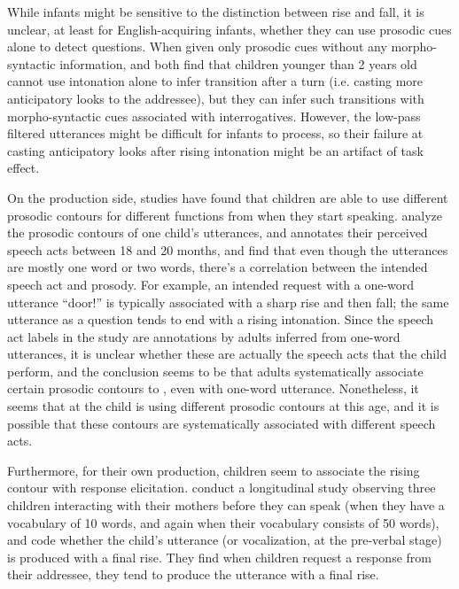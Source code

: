 While infants might be sensitive to the distinction between rise and fall, it is unclear, at least for English-acquiring infants, whether they can use prosodic cues alone to detect questions. When given only prosodic cues without any morpho-syntactic information, \textcite{keitel2013turn} and \textcite{casillas2017turn} both find that children younger than 2 years old cannot use intonation alone to infer transition after a turn (i.e. casting more anticipatory looks to the addressee), but they can infer such transitions with morpho-syntactic cues associated with interrogatives. However, the low-pass filtered utterances might be difficult for infants to process, so their failure at casting anticipatory looks after rising intonation might be an artifact of task effect.

On the production side, studies have found that children are able to use different prosodic contours for different functions from when they start speaking. \textcite{menyuk1969prosody} analyze the prosodic contours of one child's utterances, and annotates their perceived speech acts between 18  and 20 months, and find that even though the utterances are mostly one word or two words, there's a correlation between the intended speech act and prosody. For example, an intended request with a one-word utterance ``door!'' is typically associated with a sharp rise and then fall; the same utterance as a question tends to end with a rising intonation. Since the speech act labels in the study are annotations by adults inferred from one-word utterances, it is unclear whether these are actually the speech acts that the child perform, and the conclusion seems to be that adults systematically associate certain prosodic contours to \aqrs{}, even with one-word utterance. Nonetheless, it seems that at the child is using different prosodic contours at this age, and it is possible that these contours are systematically associated with different speech acts. 

Furthermore, for their own production, children seem to associate the rising contour with response elicitation. \textcite{flax1991prosody} conduct a longitudinal study observing three children interacting with their mothers before they can speak (when they have a vocabulary of 10 words, and again when their vocabulary consists of 50 words), and code whether the child's utterance (or vocalization, at the pre-verbal stage) is produced with a final rise. They find when children request a response from their addressee, they tend to produce the utterance with a final rise. 

